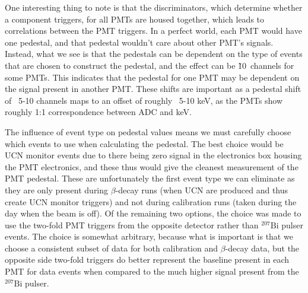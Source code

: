 One interesting thing to note is that the discriminators, which determine whether
a component triggers,
for all PMTs are housed 
together, which leads to correlations between the PMT triggers. In a perfect world, 
each PMT would have one pedestal, and that pedestal wouldn't care about other PMT's signals.
Instead, what we see is that the pedestals
can be dependent on the type of events that are chosen 
to construct the pedestal, and the effect can be \~10~channels for some PMTs.
This indicates that the pedestal for one PMT may be dependent
on the signal present in another PMT. These shifts are important as a
pedestal shift of ~5-10 channels maps to an offset of roughly
~5-10 keV, as the PMTs show roughly 1:1 correspondence between ADC and keV.

The influence of event type on pedestal values means we must carefully choose which events
to use when calculating the pedestal.
The best choice would be UCN monitor events due to there being zero signal 
in the electronics box housing the PMT electronics, and these thus would give
the cleanest measurement of the PMT pedestal.
These are unfortunately the first event type we can eliminate as they are only present
during $\beta$-decay runs (when UCN are produced and thus create UCN monitor triggers)
and not during calibration runs (taken during the day when the beam is off). 
Of the remaining two options, the choice was made to use the
two-fold PMT triggers from the opposite detector rather than $^{207}\mathrm{Bi}$ pulser
events. The choice is somewhat arbitrary, because what is important is that we choose
a consistent subset of data for both calibration and $\beta$-decay data, but the
opposite side two-fold triggers do better represent the baseline present in each PMT
for data events when compared to the much higher signal present from the $^{207}\mathrm{Bi}$
pulser.


